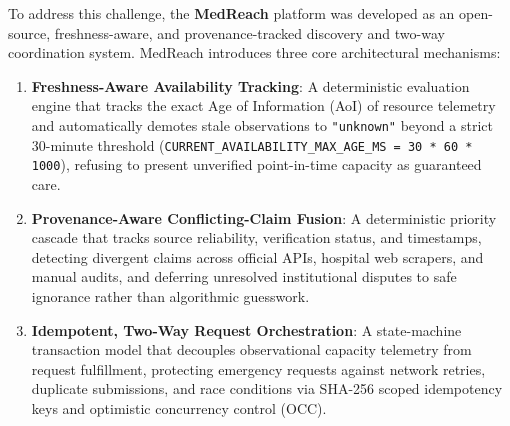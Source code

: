 \documentclass[conference]{IEEEtran}
\begin{document}
To address this challenge, the \textbf{MedReach} platform was developed as an open-source, freshness-aware, and provenance-tracked discovery and two-way coordination system. MedReach introduces three core architectural mechanisms:
\begin{enumerate}
    \item \textbf{Freshness-Aware Availability Tracking}: A deterministic evaluation engine that tracks the exact Age of Information (AoI) of resource telemetry and automatically demotes stale observations to \texttt{"unknown"} beyond a strict 30-minute threshold (\texttt{CURRENT\_AVAILABILITY\_MAX\_AGE\_MS = 30 * 60 * 1000}), refusing to present unverified point-in-time capacity as guaranteed care.
    \item \textbf{Provenance-Aware Conflicting-Claim Fusion}: A deterministic priority cascade that tracks source reliability, verification status, and timestamps, detecting divergent claims across official APIs, hospital web scrapers, and manual audits, and deferring unresolved institutional disputes to safe ignorance rather than algorithmic guesswork.
    \item \textbf{Idempotent, Two-Way Request Orchestration}: A state-machine transaction model that decouples observational capacity telemetry from request fulfillment, protecting emergency requests against network retries, duplicate submissions, and race conditions via SHA-256 scoped idempotency keys and optimistic concurrency control (OCC).
\end{enumerate}
\end{document}
